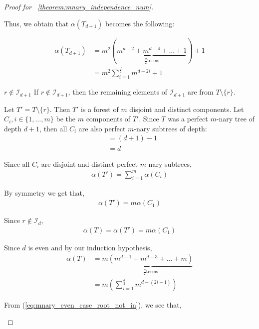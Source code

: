 \documentclass{amsart}
\theoremstyle{definition}
\begin{document}
\begin{proof}[Proof for ~\ref{theorem:mnary_independence_num}]
\begin{caseof}
\begin{subcaseof}
			Thus, we obtain that $\alpha(T_{d+1})$ becomes the following:

			\begin{align}
				\alpha(T_{d + 1}) &= m^2(\underbrace{m^{d - 2} + m^{d - 4} + \dots + 1}_{\frac{d}{2} \text{terms}}) + 1 \nonumber \\
				&= m^2 \displaystyle\sum_{i = 1}^{\frac{d}{2}}m^{d - 2i} + 1
				\label{eq:mnary_even_case_root_in}
			\end{align}

		\item  $r \not\in \mathcal{I}_{d+1}$
			If $r \not\in \mathcal{I}_{d + 1}$, then the remaining elements of $\mathcal{I}_{d + 1}$ are from $T \setminus \{r\}$.


			Let $T' = T\setminus\{r\}$. Then $T'$ is a forest of $m$ disjoint and distinct components. Let $C_i, i \in \{1, \dots, m\}$ be the $m$ components of $T'$. Since $T$ was a perfect $m$-nary tree of depth $d + 1$, then all $C_i$ are also perfect $m$-nary subtrees of depth:
			\begin{align*}
				 & = (d + 1) - 1 \\
				 & = d
			\end{align*}

			Since all $C_i$ are disjoint and distinct perfect $m$-nary subtrees,
			\begin{align*}
				 \alpha(T') = \displaystyle\sum_{i = 1}^{m}\alpha(C_i)
			\end{align*}

			By symmetry we get that,
			\begin{align*}
				\alpha(T') = m \alpha(C_1)
			\end{align*}

			Since $r \not\in \mathcal{I}_d$,
			\begin{align*}
				\alpha(T) = \alpha(T') = m \alpha(C_1)
			\end{align*}

			Since $d$ is even and by our induction hypothesis,
			\begin{align}
				\alpha(T) & = m\underbrace{(m^{d - 1} + m^{d - 3} + \dots + m)}_{\frac{d}{2} \text{terms}}           \nonumber \\
					  & = m\left(\displaystyle\sum_{i = 1}^{\frac{d}{2}}m^{d - (2i - 1)}\right) 
					  \label{eq:mnary_even_case_root_not_in}
			\end{align}

			From (\ref{eq:mnary_even_case_root_not_in}), we see that,


\end{subcaseof}
\end{caseof}
\end{proof}
\end{document}
